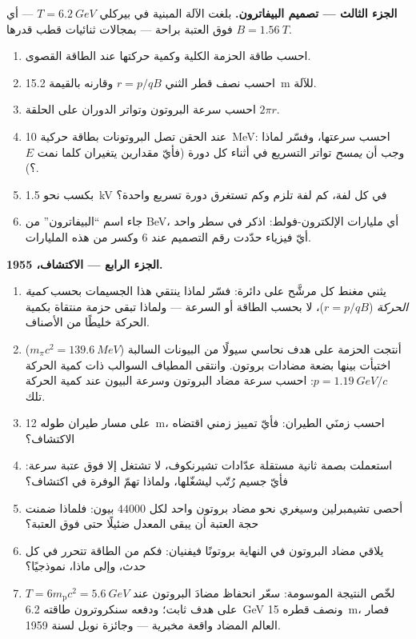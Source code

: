 \begin{problem}
\medskip\noindent\textbf{الجزء الثالث --- تصميم البيفاترون.}
بلغت الآلة المبنية في بيركلي $T = \qty{6.2}{GeV}$ ---
أي فوق العتبة براحة --- بمجالات ثنائيات قطب قدرها $B =
\qty{1.56}{T}$.
\begin{enumerate}[resume]
  \item احسب طاقة الحزمة الكلية وكمية حركتها عند الطاقة القصوى.
  \item احسب نصف قطر الثني $r = p/qB$ وقارنه بالقيمة
        \qty{15.2}{m} للآلة.
  \item احسب سرعة البروتون وتواتر الدوران على
        الحلقة $2\pi r$.
  \item عند الحقن تصل البروتونات بطاقة حركية \qty{10}{MeV}:
        احسب سرعتها، وفسّر لماذا وجب أن \emph{يمسح} تواتر
        التسريع في أثناء كل دورة (فأيّ مقدارين يتغيران كلما نمت $E$؟).
  \item بكسب نحو \qty{1.5}{kV} في كل لفة، كم لفة تلزم وكم
        تستغرق دورة تسريع واحدة؟
  \item جاء اسم ``البيفاترون'' من BeV، أي مليارات
        الإلكترون-فولط: اذكر في سطر واحد أيّ فيزياء حدّدت
        رقم التصميم عند $6$ وكسر من هذه المليارات.
\end{enumerate}

\medskip\noindent\textbf{الجزء الرابع --- الاكتشاف، 1955.}
\begin{enumerate}[resume]
  \item يثني مغنط كل مرشَّح على دائرة: فسّر لماذا ينتقي هذا
        الجسيمات بحسب \emph{كمية الحركة} ($r = p/qB$)، لا بحسب
        الطاقة أو السرعة --- ولماذا تبقى حزمة منتقاة بكمية
        الحركة خليطًا من الأصناف.
  \item أنتجت الحزمة على هدف نحاسي سيولًا من البيونات
        السالبة ($m_\pi c^2 = \qty{139.6}{MeV}$) اختبأت بينها
        بضعة مضادات بروتون. وانتقى المطياف السوالب ذات
        كمية الحركة $p = \qty{1.19}{GeV}/c$: احسب سرعة
        مضاد البروتون وسرعة البيون عند كمية الحركة تلك.
  \item على مسار طيران طوله \qty{12}{m}، احسب زمنَي
        الطيران: فأيّ تمييز زمني اقتضاه الاكتشاف؟
  \item استعملت بصمة ثانية مستقلة عدّادات تشيرنكوف،
        لا تشتغل إلا فوق عتبة سرعة: فأيّ جسيم رُتّب ليشغّلها،
        ولماذا تهمّ الوفرة في اكتشاف؟
  \item أحصى تشيمبرلين وسيغري نحو مضاد بروتون واحد لكل
        $\num{44000}$ بيون: فلماذا ضمنت حجة العتبة أن يبقى
        المعدل ضئيلًا حتى فوق العتبة؟
  \item يلاقي مضاد البروتون في النهاية بروتونًا فيفنيان:
        فكم من الطاقة تتحرر في كل حدث، وإلى ماذا،
        نموذجيًا؟
  \item لخّص النتيجة الموسومة: سعّر انحفاظ 
        مضادَ البروتون عند $T = 6m_{\text{p}}c^2 =
        \qty{5.6}{GeV}$ على هدف ثابت؛ ودفعه سنكروترون طاقته
        \qty{6.2}{GeV} ونصف قطره \qty{15}{m}، فصار العالم المضاد
        واقعة مخبرية --- وجائزة نوبل لسنة 1959.
\end{enumerate}
\end{problem}
